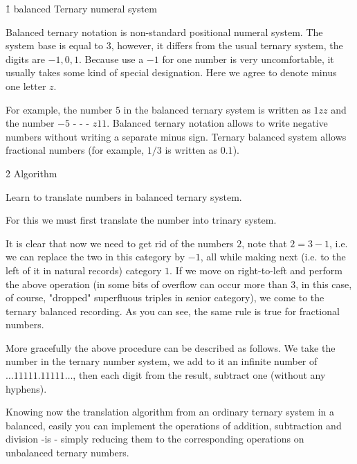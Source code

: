 \h1{ balanced Ternary numeral system }

Balanced ternary notation is non-standard positional numeral system. The system base is equal to $3$, however, it differs from the usual ternary system, the digits are $-1, 0, 1$. Because use a $-1$ for one number is very uncomfortable, it usually takes some kind of special designation. Here we agree to denote minus one letter $z$.

For example, the number $5$ in the balanced ternary system is written as $1zz$ and the number $-5$ - - - $z11$. Balanced ternary notation allows to write negative numbers without writing a separate minus sign. Ternary balanced system allows fractional numbers (for example, $1/3$ is written as $0.1$).

\h2{ Algorithm }

Learn to translate numbers in balanced ternary system.

For this we must first translate the number into trinary system.

It is clear that now we need to get rid of the numbers $2$, note that $2 = 3 - 1$, i.e. we can replace the two in this category by $-1$, all while making next (i.e. to the left of it in natural records) category $1$. If we move on right-to-left and perform the above operation (in some bits of overflow can occur more than $3$, in this case, of course, "dropped" superfluous triples in senior category), we come to the ternary balanced recording. As you can see, the same rule is true for fractional numbers.

More gracefully the above procedure can be described as follows. We take the number in the ternary number system, we add to it an infinite number of $\ldots 11111.11111 \ldots$, then each digit from the result, subtract one (without any hyphens).

Knowing now the translation algorithm from an ordinary ternary system in a balanced, easily you can implement the operations of addition, subtraction and division -is - simply reducing them to the corresponding operations on unbalanced ternary numbers.
